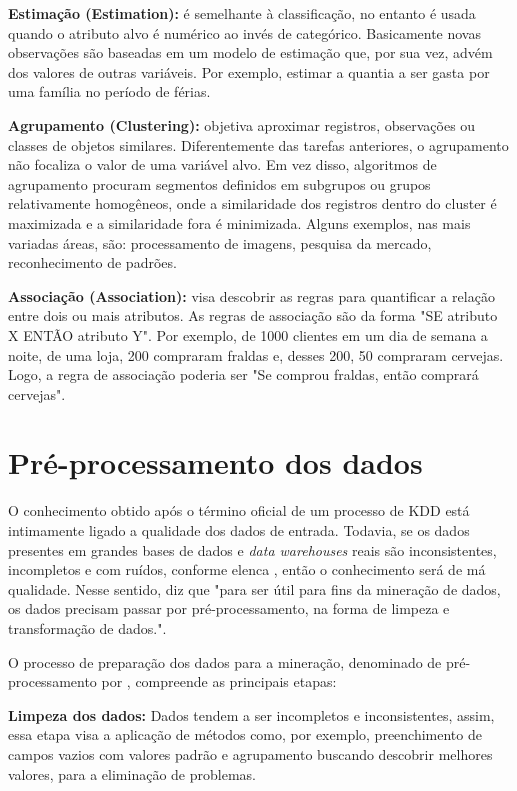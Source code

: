\documentclass[tg]{mdtufsm}
\begin{document}
\textbf{Estimação (Estimation):} é semelhante à classificação, no entanto é usada quando o atributo alvo é numérico ao invés de categórico. Basicamente novas observações são baseadas em um modelo de estimação que, por sua vez, advém dos valores de outras variáveis. Por exemplo, estimar a quantia a ser gasta por uma família no período de férias. 

\textbf{Agrupamento (Clustering):} objetiva aproximar registros, observações ou classes de objetos similares. Diferentemente das tarefas anteriores, o agrupamento não focaliza o valor de uma variável alvo. Em vez disso, algoritmos de agrupamento procuram segmentos definidos em subgrupos ou grupos relativamente homogêneos, onde a similaridade dos registros dentro do cluster é maximizada e a similaridade fora é minimizada. Alguns exemplos, nas mais variadas áreas, são: processamento de imagens, pesquisa da mercado, reconhecimento de padrões. 

\textbf{Associação (Association):} visa descobrir as regras para quantificar a relação entre dois ou mais atributos. As regras de associação são da forma "SE atributo X ENTÃO atributo Y". Por exemplo, de 1000 clientes em um dia de semana a noite, de uma loja, 200 compraram fraldas e, desses 200, 50 compraram cervejas. Logo, a regra de associação poderia ser "Se comprou fraldas, então comprará cervejas".


\section{Pré-processamento dos dados}

O conhecimento obtido após o término oficial de um processo de KDD está intimamente ligado a qualidade dos dados de entrada. Todavia, se os dados presentes em grandes bases de dados e \textit{data warehouses} reais são inconsistentes, incompletos e com ruídos, conforme elenca \cite{Han-kamber2nd}, então o conhecimento será de má qualidade. Nesse sentido, \cite{larose2005} diz que "para ser útil para fins da mineração de dados, os dados precisam passar por pré-processamento, na forma de limpeza e transformação de dados.".

O processo de preparação dos dados para a mineração, denominado de pré-processamento por \cite{Han-kamber2nd}, compreende as principais etapas:

\textbf{Limpeza dos dados:} Dados tendem a ser incompletos e inconsistentes, assim, essa etapa visa a aplicação de métodos como, por exemplo, preenchimento de campos vazios com valores padrão e agrupamento buscando descobrir melhores valores, para a eliminação de problemas. 
\end{document}
